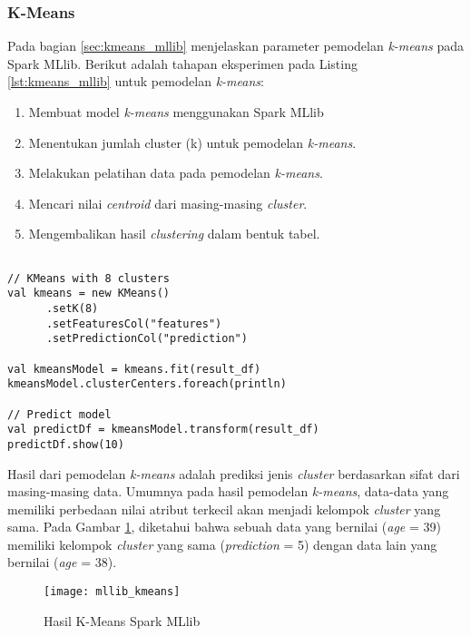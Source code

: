 \subsubsection{K-Means}
\noindent Pada bagian \ref{sec:kmeans_mllib} menjelaskan parameter pemodelan \textit{k-means} pada Spark MLlib. Berikut adalah tahapan eksperimen pada Listing \ref{lst:kmeans_mllib} untuk pemodelan \textit{k-means}:
\begin{enumerate}
\item Membuat model \textit{k-means} menggunakan Spark MLlib
\item Menentukan jumlah cluster (k) untuk pemodelan \textit{k-means}.
\item Melakukan pelatihan data pada pemodelan \textit{k-means}.
\item Mencari nilai \textit{centroid} dari masing-masing \textit{cluster}.
\item Mengembalikan hasil \textit{clustering} dalam bentuk tabel.

\end{enumerate}	
\begin{lstlisting}[basicstyle=\ttfamily, frame=single,
	columns=fullflexible, keepspaces=true, breaklines=true, label=lst:kmeans_mllib, caption=Eksperimen K-Means Spark MLlib]
	
// KMeans with 8 clusters
val kmeans = new KMeans()
      .setK(8)
      .setFeaturesCol("features")
      .setPredictionCol("prediction")

val kmeansModel = kmeans.fit(result_df)
kmeansModel.clusterCenters.foreach(println)

// Predict model
val predictDf = kmeansModel.transform(result_df)
predictDf.show(10)

\end{lstlisting}

\newpage
\par Hasil dari pemodelan \textit{k-means} adalah prediksi jenis \textit{cluster} berdasarkan sifat dari masing-masing data. Umumnya pada hasil pemodelan \textit{k-means}, data-data yang memiliki perbedaan nilai atribut terkecil akan menjadi kelompok \textit{cluster} yang sama. Pada Gambar \ref{fig:mllib_kmeans}, diketahui bahwa sebuah data yang bernilai (\textit{age} = 39) memiliki kelompok \textit{cluster} yang sama (\textit{prediction} = 5) dengan data lain yang bernilai (\textit{age} = 38).

\begin{figure}[H]
	\centering
	\texttt{[image: mllib\_kmeans]}
	\caption{Hasil K-Means Spark MLlib}
	\label{fig:mllib_kmeans}
\end{figure}

